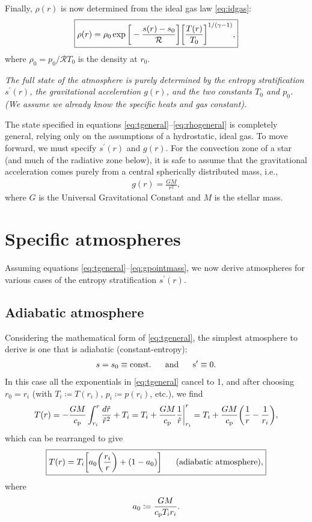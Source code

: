 \documentclass[12pt]{article} %
\newcommand{\bigfrac}[2]{\bigg{(}\frac{#1}{#2}\bigg{)}}
\newcommand{\cp}{c_{\rm{p}}}
\newcommand{\andd}{\text{and}\ \ \ \ \ }
\begin{document}
	Finally, $\rho(r)$ is now determined from the ideal gas law \eqref{eq:idgas}:
	\begin{align}
	\boxed{
	\rho(r) =\rho_0\exp\bigg{[}-\frac{s(r) - s_0}{\mathcal{R}}\bigg{]}\bigg{[}\frac{T(r)}{T_0}\bigg{]}^{1/(\gamma - 1)},
}
\label{eq:rhogeneral}
	\end{align}
	where $\rho_0=p_0/\mathcal{R}T_0$ is the density at $r_0$. 
	
	\textit{The full state of the atmosphere is purely determined by the entropy stratification $s^\prime(r)$, the gravitational acceleration $g(r)$, and the two constants $T_0$ and $p_0$. (We assume we already know the specific heats and gas constant).}
	
	The state specified in equations \eqref{eq:tgeneral}--\eqref{eq:rhogeneral} is completely general, relying only on the assumptions of a hydrostatic, ideal gas. To move forward, we must specify $s^\prime(r)$ and $g(r)$. For the convection zone of a star (and much of the radiative zone below), it is safe to assume that the gravitational acceleration comes purely from a central spherically distributed mass, i.e., 
	\begin{align}
	g(r)=\frac{GM}{r^2},
	\label{eq:gpointmass}
	\end{align}
	where $G$ is the Universal Gravitational Constant and $M$ is the stellar mass. 
	\section{Specific atmospheres}
	Assuming equations \eqref{eq:tgeneral}--\eqref{eq:gpointmass}, we now derive atmospheres for various cases of the entropy stratification $s^\prime(r)$. 
	\subsection{Adiabatic atmosphere}
	Considering the mathematical form of \eqref{eq:tgeneral}, the simplest atmosphere to derive is one that is adiabatic (constant-entropy):
	\begin{align}
	s=s_0\equiv\rm{const.} \ \ \ \ \ \andd s^\prime \equiv 0.
	\label{eq:sconst}
	\end{align}
	In this case all the exponentials in \eqref{eq:tgeneral} cancel to 1, and after choosing $r_0=r_i$ (with $T_i\coloneqq T(r_i)$, $p_i\coloneqq p(r_i)$, etc.), we find 
	\begin{align*}
	T(r) = -\frac{GM}{\cp}\int_{r_i}^r\frac{d\tilde{r}}{\tilde{r}^2} + T_i = T_i +  \frac{GM}{\cp}\frac{1}{\tilde{r}}\bigg{|}_{r_i}^r = T_i + \frac{GM}{\cp}\bigg{(}\frac{1}{r} - \frac{1}{r_i}\bigg{)},
	\end{align*}
	which can be rearranged to give 
	\begin{align}
	\boxed{
	T(r) = T_i\bigg{[}a_0\bigfrac{r_i}{r} + (1-a_0)\bigg{]}  \ \ \ \ \ \text{(adiabatic atmosphere)},
}
	\label{eq:tad}
	\end{align}
	where 
	\begin{align}
	a_0\coloneqq \frac{GM}{\cp T_i r_i}.
	\end{align}
	
\end{document}
